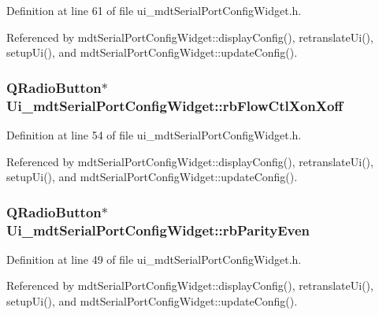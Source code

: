 Definition at line 61 of file ui\-\_\-mdt\-Serial\-Port\-Config\-Widget.\-h.



Referenced by mdt\-Serial\-Port\-Config\-Widget\-::display\-Config(), retranslate\-Ui(), setup\-Ui(), and mdt\-Serial\-Port\-Config\-Widget\-::update\-Config().

\hypertarget{class_ui__mdt_serial_port_config_widget_ab4b226a301a95c7bc1db6eda166d56a6}{
\subsubsection[{rb\-Flow\-Ctl\-Xon\-Xoff}]{\setlength{\rightskip}{0pt plus 5cm}Q\-Radio\-Button$\ast$ Ui\-\_\-mdt\-Serial\-Port\-Config\-Widget\-::rb\-Flow\-Ctl\-Xon\-Xoff}}\label{class_ui__mdt_serial_port_config_widget_ab4b226a301a95c7bc1db6eda166d56a6}


Definition at line 54 of file ui\-\_\-mdt\-Serial\-Port\-Config\-Widget.\-h.



Referenced by mdt\-Serial\-Port\-Config\-Widget\-::display\-Config(), retranslate\-Ui(), setup\-Ui(), and mdt\-Serial\-Port\-Config\-Widget\-::update\-Config().

\hypertarget{class_ui__mdt_serial_port_config_widget_ae1ce4b26a70ab70ce53f2b6078263e0c}{
\subsubsection[{rb\-Parity\-Even}]{\setlength{\rightskip}{0pt plus 5cm}Q\-Radio\-Button$\ast$ Ui\-\_\-mdt\-Serial\-Port\-Config\-Widget\-::rb\-Parity\-Even}}\label{class_ui__mdt_serial_port_config_widget_ae1ce4b26a70ab70ce53f2b6078263e0c}


Definition at line 49 of file ui\-\_\-mdt\-Serial\-Port\-Config\-Widget.\-h.



Referenced by mdt\-Serial\-Port\-Config\-Widget\-::display\-Config(), retranslate\-Ui(), setup\-Ui(), and mdt\-Serial\-Port\-Config\-Widget\-::update\-Config().

